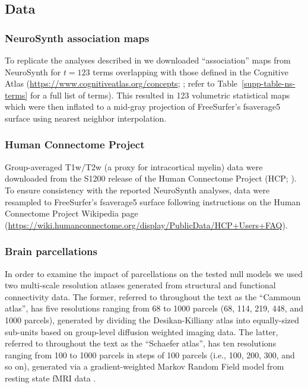 \documentclass[12pt,aps,pra,reprint,showkeys]{revtex4-1}
\begin{document}
\subsection*{Data}

\subsubsection*{NeuroSynth association maps}

To replicate the analyses described in \citet{alexanderbloch2018neuroimage} we downloaded ``association'' maps from NeuroSynth \citep{yarkoni2011natmethods} for $t = 123$ terms overlapping with those defined in the Cognitive Atlas (\url{https://www.cognitiveatlas.org/concepts}; \citealt{poldrack2011neuron, poldrack2016annrevpsych}; refer to Table~\ref{supp-table-ns-terms} for a full list of terms).
This resulted in 123 volumetric statistical maps which were then inflated to a mid-gray projection of FreeSurfer's fsaverage5 surface using nearest neighbor interpolation.

\subsubsection*{Human Connectome Project}

Group-averaged T1w/T2w (a proxy for intracortical myelin) data were downloaded from the S1200 release of the Human Connectome Project (HCP; \citealt{vanessen2013neuroimage}).
To ensure consistency with the reported NeuroSynth analyses, data were resampled to FreeSurfer's fsaverage5 surface following instructions on the Human Connectome Project Wikipedia page (\url{https://wiki.humanconnectome.org/display/PublicData/HCP+Users+FAQ}).

\subsubsection*{Brain parcellations}

In order to examine the impact of parcellations on the tested null models we used two multi-scale resolution atlases generated from structural \citep{cammoun2012mapping} and functional \citep{schaefer2018cercor} connectivity data.
The former, referred to throughout the text as the ``Cammoun atlas'', has five resolutions ranging from 68 to 1000 parcels (68, 114, 219, 448, and 1000 parcels), generated by dividing the Desikan-Killiany atlas \citep{desikan2006automated} into equally-sized sub-units based on group-level diffusion weighted imaging data.
The latter, referred to throughout the text as the ``Schaefer atlas'', has ten resolutions ranging from 100 to 1000 parcels in steps of 100 parcels (i.e., 100, 200, 300, and so on), generated via a gradient-weighted Markov Random Field model from resting state fMRI data \citep{schaefer2018cercor}.
\end{document}
